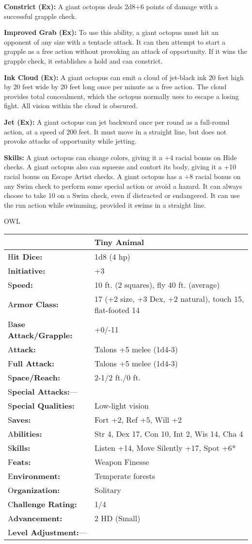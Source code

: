 \documentclass{article}
\begin{document}
\textbf{Constrict (Ex): }A giant octopus deals 2d8+6 points of damage with a successful 
grapple check.

\textbf{Improved Grab (Ex): }To use this ability, a giant octopus must hit an opponent 
of any size with a tentacle attack. It can then attempt to start a grapple as a 
free action without provoking an attack of opportunity. If it wins the grapple 
check, it establishes a hold and can constrict.

\textbf{Ink Cloud (Ex): }A giant octopus can emit a cloud of jet-black ink 20 feet 
high by 20 feet wide by 20 feet long once per minute as a free action. The cloud 
provides total concealment, which the octopus normally uses to escape a losing 
fight. All vision within the cloud is obscured.

\textbf{Jet (Ex): }A giant octopus can jet backward once per round as a full-round 
action, at a speed of 200 feet. It must move in a straight line, but does not provoke 
attacks of opportunity while jetting. 

\textbf{Skills:} A giant octopus can change colors, giving it a +4 racial bonus 
on Hide checks. A giant octopus also can squeeze and contort its body, giving it 
a +10 racial bonus on Escape Artist checks. A giant octopus has a +8 racial bonus 
on any Swim check to perform some special action or avoid a hazard. It can always 
choose to take 10 on a Swim check, even if distracted or endangered. It can use 
the run action while swimming, provided it swims in a straight line.

\vspace{12pt}
OWL

\begin{tabular}{|>{\raggedright}p{91pt}|>{\raggedright}p{226pt}|}
\hline
  & Tiny Animal\tabularnewline
\hline
H\textbf{it Dice:} & 1d8 (4 hp)\tabularnewline
\hline
I\textbf{nitiative:} & +3\tabularnewline
\hline
S\textbf{peed:} & 10 ft. (2 squares), fly 40 ft. (average)\tabularnewline
\hline
A\textbf{rmor Class:} & 17 (+2 size, +3 Dex, +2 natural), touch 15, flat-footed 
14\tabularnewline
\hline
B\textbf{ase Attack/Grapple:} & +0/-11\tabularnewline
\hline
A\textbf{ttack:} & Talons +5 melee (1d4-3)\tabularnewline
\hline
F\textbf{ull Attack:} & Talons +5 melee (1d4-3)\tabularnewline
\hline
S\textbf{pace/Reach:} & 2-1/2 ft./0 ft.\tabularnewline
\hline
S\textbf{pecial Attacks:}--- & \tabularnewline
\hline
S\textbf{pecial Qualities:} & Low-light vision\tabularnewline
\hline
S\textbf{aves:} & Fort +2, Ref +5, Will +2\tabularnewline
\hline
A\textbf{bilities:} & Str 4, Dex 17, Con 10, Int 2, Wis 14, Cha 4\tabularnewline
\hline
S\textbf{kills:} & Listen +14, Move Silently +17, Spot +6*\tabularnewline
\hline
F\textbf{eats:} & Weapon Finesse\tabularnewline
\hline
E\textbf{nvironment:} & Temperate forests\tabularnewline
\hline
O\textbf{rganization:} & Solitary\tabularnewline
\hline
C\textbf{hallenge Rating:} & 1/4\tabularnewline
\hline
A\textbf{dvancement:} & 2 HD (Small)\tabularnewline
\hline
L\textbf{evel Adjustment:}--- & \tabularnewline
\hline
\end{tabular}
\end{document}
